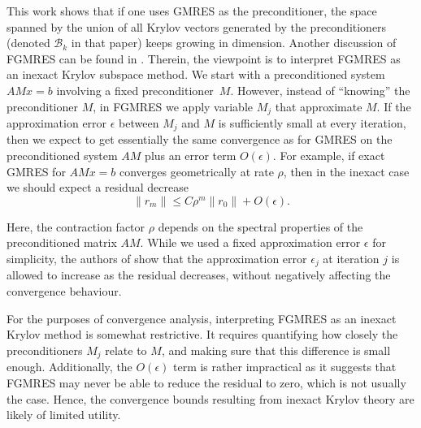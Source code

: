 \documentclass{siamart251216}
\newenvironment{lauri}{\begin{quote}\color{brilliantrose} \small\sf Lauri $\clubsuit$~}{\end{quote}}
\begin{document}
{This work shows that if one uses GMRES as the preconditioner, the space spanned by the union of all Krylov vectors generated by the preconditioners (denoted $\mathcal{B}_k$ in that paper) keeps growing in dimension. 
Another discussion of FGMRES can be found in \cite{simoncini2003theory}. Therein, the viewpoint is to interpret FGMRES as an inexact Krylov subspace method. We start with a preconditioned system $AMx = b$ involving a fixed preconditioner~$M$. However, instead of ``knowing'' the preconditioner $M$, in FGMRES we apply variable $M_j$ that approximate $M$. If the approximation error $\epsilon$ between $M_j$ and $M$ is sufficiently small at every iteration, then we expect to get essentially the same convergence as for GMRES on the preconditioned system $AM$ plus an error term $O(\epsilon)$. For example, if exact GMRES for $AM x = b$ converges geometrically at rate $\rho$, then in the inexact case we should expect a residual decrease
$$\|r_m\| \le C \rho^m \|r_0\| + O(\epsilon).$$

Here, the contraction factor $\rho$ depends on the spectral properties of the preconditioned matrix $AM$. {While we used a fixed approximation error $\epsilon$ for simplicity, the authors of  \cite{simoncini2003theory} show that the approximation error $\epsilon_j$ at iteration $j$ is allowed to increase as the residual decreases, without negatively affecting the convergence behaviour.}

For the purposes of convergence analysis, interpreting FGMRES as an inexact Krylov method is somewhat restrictive. It requires quantifying how closely the preconditioners $M_j$ relate to $M$, and making sure that this difference is small enough. Additionally, the $O(\epsilon)$ term is rather impractical as it suggests that FGMRES may never be able to reduce the residual to zero, which is not usually the case. Hence, the convergence bounds resulting from inexact Krylov theory are likely of limited utility.

}
\end{document}
